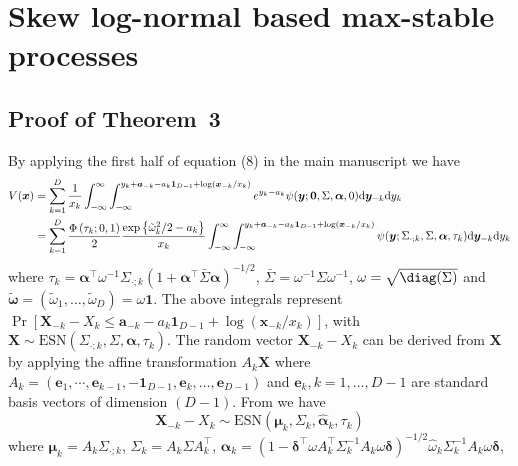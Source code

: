 \documentclass[12pt]{article}
\begin{document}
\section{Skew log-normal based max-stable processes}
\label{sec:skew-log-normal_appendix}
\subsection{Proof of Theorem~3}

By applying the first half of equation (8) in the main manuscript we have
\begin{align}
\label{eq:V_skBR1}
V(\bm x) &= 
\sum_{k=1}^D \frac{1}{x_k} \int_{-\infty}^\infty \int_{-\infty}^{y_k+\bm a_{-k}-a_k\bm 1_{D-1}+\log(\bm x_{-k}/x_k)} e^{y_k-a_k} \psi(\bm y;\bm 0, \Sigma,\bm \alpha, 0) \text d \bm y_{-k} \text d y_k \nonumber \\
&= \sum_{k=1}^D \frac{\Phi\left(\tau_k; 0, 1\right)}{2} \frac{\exp \left\{\tilde{\omega}_k^2/2-a_k\right\}}{x_k} \int_{-\infty}^\infty\int_{-\infty}^{y_k+ \bm a_{-k}-a_k\bm 1_{D-1}+\log(\bm x_{-k}/x_k)}
\psi(\bm y;\Sigma_{\cdot;k}, \Sigma, \bm \alpha, \tau_k)\text d \bm y_{-k} \text d y_k
\end{align}
where $\tau_k=\bm \alpha^\top\omega^{-1}\Sigma_{\cdot;k} \left(1+\bm\alpha^\top\bar\Sigma \bm\alpha \right)^{-1/2}$, $\bar{\Sigma} = \omega^{-1} \Sigma \omega^{-1}$, $\omega = \sqrt{\diag(\Sigma)}$ and $\tilde{\bm \omega} = \left( \tilde{\omega}_1, \ldots, \tilde{ \omega}_D\right) = \omega \bm 1$. The above integrals represent $\Pr[\bm X_{-k}-X_k\leq \bm a_{-k}-a_{k}\bm 1_{D-1}+\log(\bm x_{-k}/x_k)]$, with $\bm X \sim \text{ESN}(\Sigma_{\cdot;k},\Sigma,\bm \alpha, \tau_k)$. The random vector $\bm X_{-k}-X_k$ can be derived from $\bm X$ by applying the affine transformation $A_k \bm X$ where $A_k = (\bm e_1,\cdots,\bm e_{k-1},-\bm 1_{D-1},\bm e_{k},\ldots,\bm e_{D-1})$ and $\bm e_k, k=1, \ldots, D-1$ are standard basis vectors of dimension $(D-1)$. From \citet[Chapter~5]{Azzalini:2013} we have 
%
$$
\bm X_{-k}-X_k \sim \text{ESN} \left( \bm \mu_k, \Sigma_k, \hat{\bm \alpha}_k, \tau_k\right)
$$
%
where $\bm \mu_k = A_k\Sigma_{\cdot;k}$, 
$\Sigma_k = A_k\Sigma A_k^\top$, 
$\hat{\bm \alpha}_k = (1-\bm\delta^\top \omega A_k^\top\Sigma_k^{-1}A_k\omega\bm\delta)^{-1/2} \hat \omega_k \Sigma_k^{-1}A_k\omega\bm\delta$, 
\end{document}
